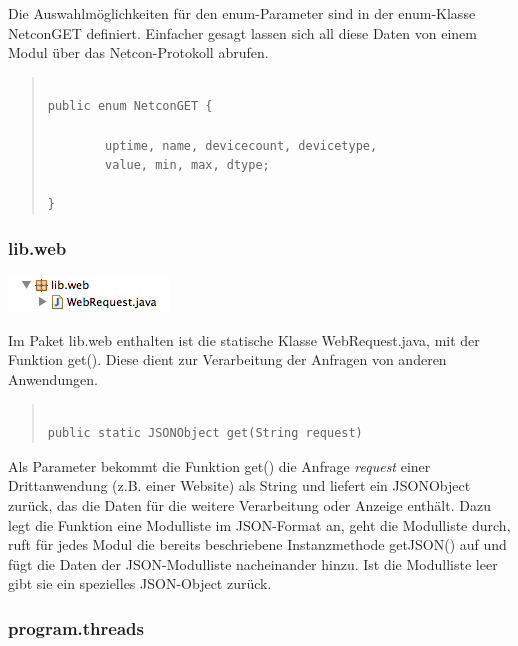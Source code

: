 \documentclass[a4paper,14pt,headsepline]{scrartcl}
\begin{document}
Die Auswahlmöglichkeiten für den enum-Parameter sind in der enum-Klasse NetconGET definiert. Einfacher gesagt lassen sich all diese Daten von einem Modul über das Netcon-Protokoll abrufen.  


\begin{quote}
\begin{verbatim}

public enum NetconGET {

	    uptime, name, devicecount, devicetype, 
	    value, min, max, dtype;

}

\end{verbatim}
\end{quote}

\newpage

\subsubsection*{lib.web}

\includegraphics[width=0.2 \paperwidth]{./bilder/lib_web.png}

Im Paket lib.web enthalten ist die statische Klasse WebRequest.java, mit der Funktion get(). Diese dient zur Verarbeitung der Anfragen von anderen Anwendungen. 

\begin{quote}
\begin{verbatim}

public static JSONObject get(String request)

\end{verbatim}
\end{quote} 

Als Parameter bekommt die Funktion get() die Anfrage \textit{request} einer Drittanwendung (z.B. einer Website) als String und liefert ein JSONObject zurück, das die Daten für die weitere Verarbeitung oder Anzeige enthält. Dazu legt die Funktion eine Modulliste im JSON-Format an, geht die Modulliste durch, ruft für jedes Modul die bereits beschriebene Instanzmethode getJSON() auf und fügt die Daten der JSON-Modulliste nacheinander hinzu. Ist die Modulliste leer gibt sie ein spezielles JSON-Object zurück. 

\newpage

\subsubsection*{program.threads}
\end{document}
